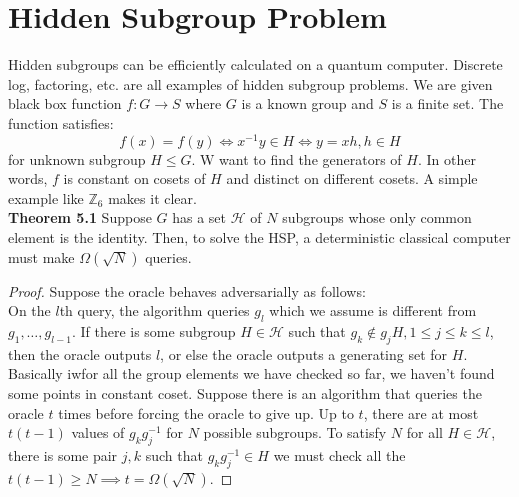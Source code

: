 \documentclass{article}
\begin{document}
\section{Hidden Subgroup Problem}
Hidden subgroups can be efficiently calculated on a quantum computer. Discrete log, factoring, etc. are all examples of hidden subgroup problems. We are given black box function $f: G \to S$ where $G$ is a known group and $S$ is a finite set. The function satisfies:
$$f(x) = f(y) \iff x^{-1} y \in H \iff y = xh, h \in H$$
for unknown subgroup $H \leq G$. W want to find the generators of $H$. In other words, $f$ is constant on cosets of $H$ and distinct on different cosets. A simple example like $\mathbb{Z}_6$ makes it clear.\\
\textbf{Theorem 5.1} Suppose $G$ has a set $\mathcal{H}$ of $N$ subgroups whose only common element is the identity. Then, to solve the HSP, a deterministic classical computer must make $\Omega(\sqrt{N})$ queries.
\begin{proof} 
	Suppose the oracle behaves adversarially as follows:\\
	On the $l$th query, the algorithm queries $g_l$ which we assume is different from $g_1, \dots, g_{l-1}$. If there is some subgroup $H \in \mathcal{H}$ such that $g_k \not \in g_j H, 1 \leq j \leq k \leq l$, then the oracle outputs $l$, or else the oracle outputs a generating set for $H$. Basically iwfor all the group elements we have checked so far, we haven't found some points in constant coset. Suppose there is an algorithm that queries the oracle $t$ times before forcing the oracle to give up. Up to $t$, there are at most $t(t-1) $ values of $g_k g_j^{-1}$ for $N$ possible subgroups. To satisfy $N$ for all $H\in \mathcal{H}$, there is some pair $j,k$ such that $g_k g_j^{-1} \in H$ we must check all the $t(t-1) \geq N \implies t = \Omega(\sqrt{N})$.
\end{proof}
\end{document}
